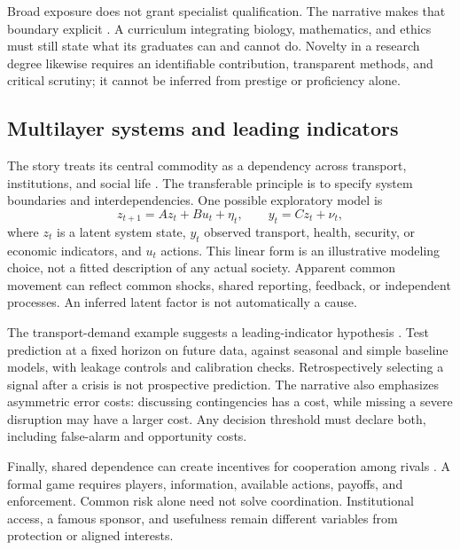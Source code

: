 Broad exposure does not grant specialist qualification. The narrative makes that boundary explicit . A curriculum integrating biology, mathematics, and ethics must still state what its graduates can and cannot do. Novelty in a research degree likewise requires an identifiable contribution, transparent methods, and critical scrutiny; it cannot be inferred from prestige or proficiency alone.

\subsection{Multilayer systems and leading indicators}
The story treats its central commodity as a dependency across transport, institutions, and social life . The transferable principle is to specify system boundaries and interdependencies. One possible exploratory model is
\begin{equation}
 z_{t+1}=Az_t+Bu_t+\eta_t,\qquad
 y_t=Cz_t+\nu_t,
\end{equation}
where $z_t$ is a latent system state, $y_t$ observed transport, health, security, or economic indicators, and $u_t$ actions. This linear form is an illustrative modeling choice, not a fitted description of any actual society. Apparent common movement can reflect common shocks, shared reporting, feedback, or independent processes. An inferred latent factor is not automatically a cause.

The transport-demand example suggests a leading-indicator hypothesis . Test prediction at a fixed horizon on future data, against seasonal and simple baseline models, with leakage controls and calibration checks. Retrospectively selecting a signal after a crisis is not prospective prediction. The narrative also emphasizes asymmetric error costs: discussing contingencies has a cost, while missing a severe disruption may have a larger cost. Any decision threshold must declare both, including false-alarm and opportunity costs.

Finally, shared dependence can create incentives for cooperation among rivals . A formal game requires players, information, available actions, payoffs, and enforcement. Common risk alone need not solve coordination. Institutional access, a famous sponsor, and usefulness remain different variables from protection or aligned interests.
